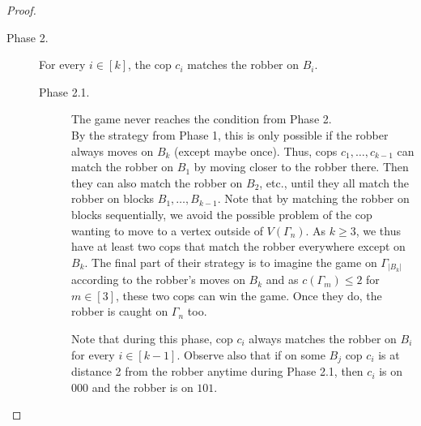 \documentclass[11pt]{article}
\begin{document}
\begin{proof}
\begin{description}
        \item[Phase 2.] For every $i \in [k]$, the cop $c_i$ matches the robber on $B_i$.
        \begin{description}
            \item[Phase 2.1.] The game never reaches the condition from Phase 2.\\
            By the strategy from Phase 1, this is only possible if the robber always moves on $B_k$ (except maybe once). Thus, cops $c_1, \ldots, c_{k-1}$ can match the robber on $B_1$ by moving closer to the robber there. Then they can also match the robber on $B_2$, etc., until they all match the robber on blocks $B_1, \ldots, B_{k-1}$. Note that by matching the robber on blocks sequentially, we avoid the possible problem of the cop wanting to move to a vertex outside of $V(\Gamma_n)$. As $k \geq 3$, we thus have at least two cops that match the robber everywhere except on $B_k$. The final part of their strategy is to imagine the game on $\Gamma_{|B_k|}$ according to the robber's moves on $B_k$ and as $c(\Gamma_m) \leq 2$ for $m \in [3]$, these two cops can win the game. Once they do, the robber is caught on $\Gamma_n$ too.

            Note that during this phase, cop $c_i$ always matches the robber on $B_i$ for every $i \in [k-1]$. Observe also that if on some $B_j$ cop $c_i$ is at distance 2 from the robber anytime during Phase 2.1, then $c_i$ is on $000$ and the robber is on $101$. 


\end{description}
\end{description}
\end{proof}
\end{document}
